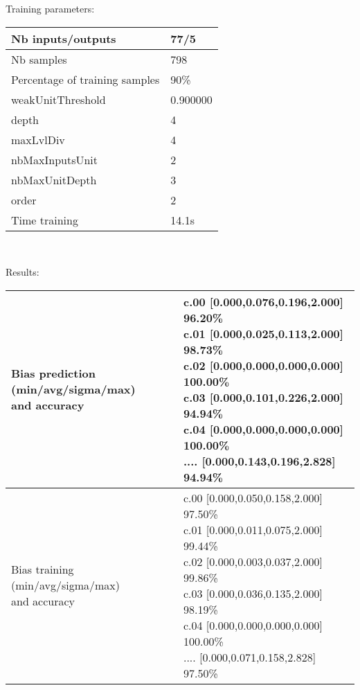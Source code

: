 Training parameters:\\
\begin{center}
\begin{tabular}{|l|l|}
\hline
Nb inputs/outputs&77/5\\
\hline
Nb samples&798\\
\hline
Percentage of training samples&90\%\\
\hline
weakUnitThreshold&0.900000\\
\hline
depth&4\\
\hline
maxLvlDiv&4\\
\hline
nbMaxInputsUnit&2\\
\hline
nbMaxUnitDepth&3\\
\hline
order&2\\
\hline
Time training&14.1s\\
\hline
\end{tabular}\\
\end{center}\newline
Results:
\begin{center}
\begin{tabular}{|l|l|}
\hline
\makecell{Bias prediction (min/avg/sigma/max)\\and accuracy}&\makecell{c.00 [0.000,0.076,0.196,2.000] 96.20\%\\
c.01 [0.000,0.025,0.113,2.000] 98.73\%\\
c.02 [0.000,0.000,0.000,0.000] 100.00\%\\
c.03 [0.000,0.101,0.226,2.000] 94.94\%\\
c.04 [0.000,0.000,0.000,0.000] 100.00\%\\
.... [0.000,0.143,0.196,2.828] 94.94\%\\
}\\

\hline
\makecell{Bias training (min/avg/sigma/max)\\and accuracy}&\makecell{c.00 [0.000,0.050,0.158,2.000] 97.50\%\\
c.01 [0.000,0.011,0.075,2.000] 99.44\%\\
c.02 [0.000,0.003,0.037,2.000] 99.86\%\\
c.03 [0.000,0.036,0.135,2.000] 98.19\%\\
c.04 [0.000,0.000,0.000,0.000] 100.00\%\\
.... [0.000,0.071,0.158,2.828] 97.50\%\\
}\\
\hline
\end{tabular}\
\end{center}
